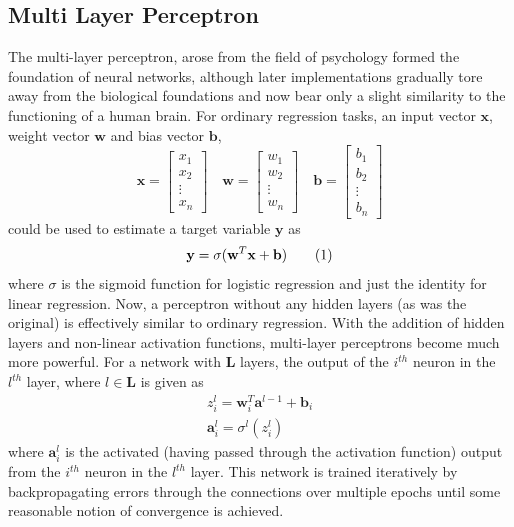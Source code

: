 \documentclass[%
 twocolumn,
 reprint,
 amsmath,amssymb,
 aps,nofootinbib
]{revtex4-2}
\newcommand\numberthis{\addtocounter{equation}{1}\tag{\theequation}} %
\begin{document}
\subsection{\label{app:mlp}Multi Layer Perceptron}
The multi-layer perceptron, arose from the field of psychology \cite{mlp} formed the foundation of neural networks, although later implementations gradually tore away from the biological foundations and now bear only a slight similarity to the functioning of a human brain. For ordinary regression tasks, an input vector $\mathbf{x}$, weight vector $\mathbf{w}$ and bias vector $\mathbf{b}$,
\[
\mathbf{x} = \begin{bmatrix}
x_1 \\
x_2 \\
\vdots \\
x_n
\end{bmatrix}
\quad
\mathbf{w} = \begin{bmatrix}
w_1 \\
w_2 \\
\vdots \\
w_n
\end{bmatrix}
\quad
\mathbf{b} = \begin{bmatrix}
b_1 \\
b_2 \\
\vdots \\
b_n
\end{bmatrix}
\]
could be used to estimate a target variable $\mathbf{y}$ as 
\[
\mathbf{y} = \sigma(\mathbf{w}^T\mathbf{x}+\mathbf{b}) \numberthis  \label{eq:mlp}
\]
where $\sigma$ is the sigmoid function for logistic regression and just the identity for linear regression. Now, a perceptron without any hidden layers (as was the original) is effectively similar to ordinary regression. With the addition of hidden layers and non-linear activation functions, multi-layer perceptrons become much more powerful. For a network with $\mathbf{L}$ layers, the output of the $i^{th}$ neuron in the $l^{th}$ layer, where $l \in \mathbf{L}$ is given as
\begin{gather}
z^{l}_{i} = \mathbf{w}^{T}_{i}\mathbf{a}^{l-1} + \mathbf{b}_i \label{eq:mlp_inactivate} \\
\mathbf{a}^{l}_i = \sigma^{l}(z^{l}_{i}) \label{eq:mlp_activated}
\end{gather}
where $\mathbf{a}^{l}_{i}$ is the activated (having passed through the activation function) output from the $i^{th}$ neuron in the $l^{th}$ layer. This network is trained iteratively by backpropagating \cite{backprop} errors through the connections over multiple epochs until some reasonable notion of convergence is achieved.
\end{document}
